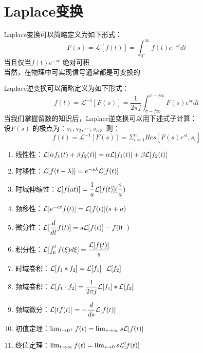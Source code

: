 \section{Laplace变换}
\begin{definition}[拉氏变换]
    Laplace变换可以简略定义为如下形式：
    \begin{equation*}
        F(s) = \mathcal{L}[f(t)] = \int_{0^{-}}^\infty f(t) e^{-st} dt 
    \end{equation*}
    当且仅当$f(t) e^{-st}$ 绝对可积 \\
    当然，在物理中可实现信号通常都是可变换的
\end{definition}

\begin{definition}[拉氏逆变换]
    Laplace逆变换可以简略定义为如下形式：
    \begin{equation*}
        f(t) = \mathcal{L}^{-1} [F(s)] = \frac{1}{2\pi j} \int_{\sigma - j \infty} ^{\sigma + j\infty} F(s) e^{st} dt
    \end{equation*}
    当我们掌握留数的知识后，Laplace逆变换可以用下述式子计算：\\
    设$F(s)$ 的极点为：$s_1,s_2,\cdots,s_n$，则：
    \begin{equation*}
        f(t) = \mathcal{L}^{-1} [F(s)] = \Sigma_{i=1}^n Res[F(s)e^{st},s_i]
    \end{equation*}
\end{definition}

\begin{property}[Laplace变换的性质]
    \begin{enumerate}
        \item 线性性：$\mathcal{L} [\alpha f_1(t) + \beta f_2(t)] = \alpha \mathcal{L}[f_1(t)] + \beta \mathcal{L}[f_2(t)] $ 
        \item 时移性：$\mathcal{L} [f(t-\lambda)] = e^{-s\lambda} \mathcal{L} [f(t)]$ 
        \item 时域伸缩性：$\mathcal{L} [f(at)] = \dfrac{1}{a} \mathcal{L}[f(t)](\dfrac{s}{a}) $
        \item 频移性：$\mathcal{L}[e^{-at}f(t)] = \mathcal{L}[f(t)] (s+a)$ 
        \item 微分性：$\mathcal{L}[\dfrac{d}{dt}f(t)] = s\mathcal{L}[f(t)] - f(0^-)$ 
        \item 积分性：$\mathcal{L} [\int_0^t f(\xi) d\xi] = \dfrac{\mathcal{L}[f(t)]}{s}$ 
        \item 时域卷积：$\mathcal{L} [f_1 * f_2] = \mathcal{L}[f_1]\cdot \mathcal{L}[f_2]$ 
        \item 频域卷积：$\mathcal{L} [f_1\cdot f_2]= \dfrac{1}{2\pi j} \mathcal{L}[f_1] * \mathcal{L}[f_2]$
        \item 频域微分：$\mathcal{L} [tf(t)] = -\dfrac{d}{ds}\mathcal{L}[f(t)] $
        \item 初值定理：$\lim_{t\rightarrow 0^+} f(t) = \lim _{s\rightarrow \infty} s\mathcal{L}[f(t)]$
        \item 终值定理：$ \lim_{t\rightarrow \infty} f(t) = \lim_{s\rightarrow 0} s\mathcal{L}[f(t)]$
    \end{enumerate}
\end{property}

